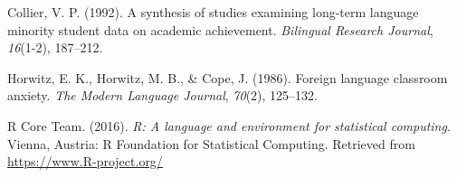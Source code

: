 \documentclass[english,floatsintext,man]{apa6}
\theoremstyle{definition}
\theoremstyle{definition}
\theoremstyle{definition}
\theoremstyle{remark}
\begin{document}
\hypertarget{ref-collier1992synthesis}{}
Collier, V. P. (1992). A synthesis of studies examining long-term
language minority student data on academic achievement. \emph{Bilingual
Research Journal}, \emph{16}(1-2), 187--212.

\hypertarget{ref-horwitz1986foreign}{}
Horwitz, E. K., Horwitz, M. B., \& Cope, J. (1986). Foreign language
classroom anxiety. \emph{The Modern Language Journal}, \emph{70}(2),
125--132.

\hypertarget{ref-R}{}
R Core Team. (2016). \emph{R: A language and environment for statistical
computing}. Vienna, Austria: R Foundation for Statistical Computing.
Retrieved from \url{https://www.R-project.org/}
\end{document}
